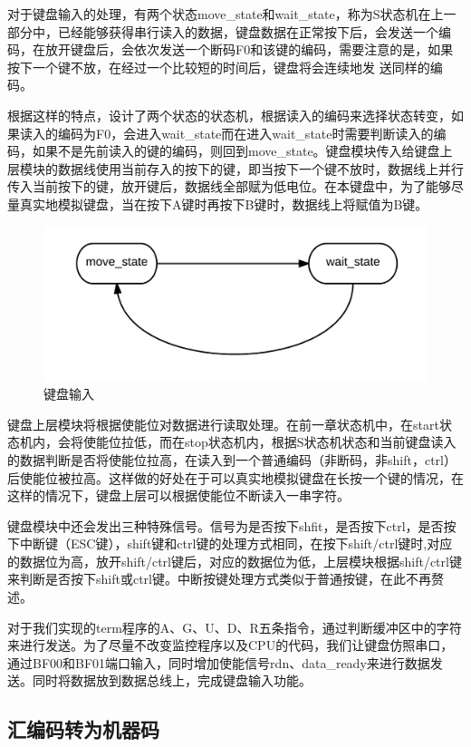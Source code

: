 对于键盘输入的处理，有两个状态move\_state和wait\_state，称为S状态机在上一部分中，已经能够获得串行读入的数据，键盘数据在正常按下后，会发送一个编码，在放开键盘后，会依次发送一个断码F0和该键的编码，需要注意的是，如果按下一个键不放，在经过一个比较短的时间后，键盘将会连续地发
送同样的编码。

根据这样的特点，设计了两个状态的状态机，根据读入的编码来选择状态转变，如果读入的编码为F0，会进入wait\_state而在进入wait\_state时需要判断读入的编码，如果不是先前读入的键的编码，则回到move\_state。键盘模块传入给键盘上层模块的数据线使用当前存入的按下的键，即当按下一个键不放时，数据线上并行传入当前按下的键，放开键后，数据线全部赋为低电位。在本键盘中，为了能够尽量真实地模拟键盘，当在按下A键时再按下B键时，数据线上将赋值为B键。

\begin{figure}[H]
  \includegraphics[width=\linewidth]{Figures/keyboard.png}
  \caption{键盘输入}
\end{figure}

键盘上层模块将根据使能位对数据进行读取处理。在前一章状态机中，在start状态机内，会将使能位拉低，而在stop状态机内，根据S状态机状态和当前键盘读入的数据判断是否将使能位拉高，在读入到一个普通编码（非断码，非shift，ctrl）后使能位被拉高。这样做的好处在于可以真实地模拟键盘在长按一个键的情况，在这样的情况下，键盘上层可以根据使能位不断读入一串字符。

键盘模块中还会发出三种特殊信号。信号为是否按下shfit，是否按下ctrl，是否按下中断键（ESC键），shift键和ctrl键的处理方式相同，在按下shift/ctrl键时,对应的数据位为高，放开shift/ctrl键后，对应的数据位为低，上层模块根据shift/ctrl键来判断是否按下shift或ctrl键。中断按键处理方式类似于普通按键，在此不再赘述。

对于我们实现的term程序的A、G、U、D、R五条指令，通过判断缓冲区中的字符来进行发送。为了尽量不改变监控程序以及CPU的代码，我们让键盘仿照串口，通过BF00和BF01端口输入，同时增加使能信号rdn、data\_ready来进行数据发送。同时将数据放到数据总线上，完成键盘输入功能。

\subsection{汇编码转为机器码}

